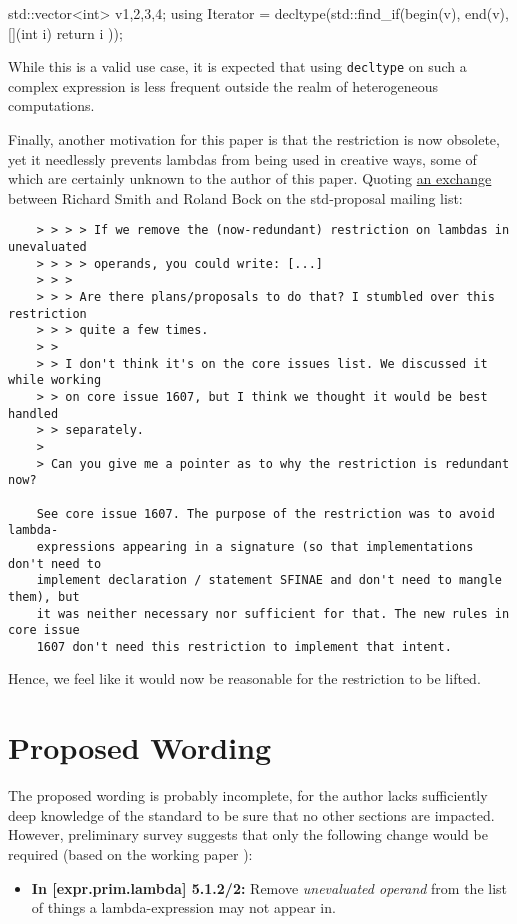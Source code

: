 \documentclass[11pt]{article}
\newcommand{\cc}[1]{\texttt{#1}}
\begin{document}
\begin{cpp}
std::vector<int> v{1,2,3,4};
using Iterator = decltype(std::find_if(begin(v), end(v), [](int i) {
  return i %
}));
\end{cpp}

While this is a valid use case, it is expected that using \cc{decltype} on
such a complex expression is less frequent outside the realm of heterogeneous
computations.

Finally, another motivation for this paper is that the restriction is now
obsolete, yet it needlessly prevents lambdas from being used in creative ways,
some of which are certainly unknown to the author of this paper. Quoting
\href{https://goo.gl/ysUIdv}{an exchange} between Richard Smith and Roland
Bock on the std-proposal mailing list:

\begin{verbatim}
    > > > > If we remove the (now-redundant) restriction on lambdas in unevaluated
    > > > > operands, you could write: [...]
    > > >
    > > > Are there plans/proposals to do that? I stumbled over this restriction
    > > > quite a few times.
    > >
    > > I don't think it's on the core issues list. We discussed it while working
    > > on core issue 1607, but I think we thought it would be best handled
    > > separately.
    >
    > Can you give me a pointer as to why the restriction is redundant now?

    See core issue 1607. The purpose of the restriction was to avoid lambda-
    expressions appearing in a signature (so that implementations don't need to
    implement declaration / statement SFINAE and don't need to mangle them), but
    it was neither necessary nor sufficient for that. The new rules in core issue
    1607 don't need this restriction to implement that intent.
\end{verbatim}

Hence, we feel like it would now be reasonable for the restriction to be lifted.


\section{Proposed Wording}
The proposed wording is probably incomplete, for the author lacks sufficiently deep
knowledge of the standard to be sure that no other sections are impacted. However,
preliminary survey suggests that only the following change would be required
(based on the working paper \cite{N4296}):

\begin{itemize}
    \item[] \textbf{In [expr.prim.lambda] 5.1.2/2:}
    Remove \textit{unevaluated operand} from the list of things a lambda-expression
    may not appear in.
\end{itemize}
\end{document}
